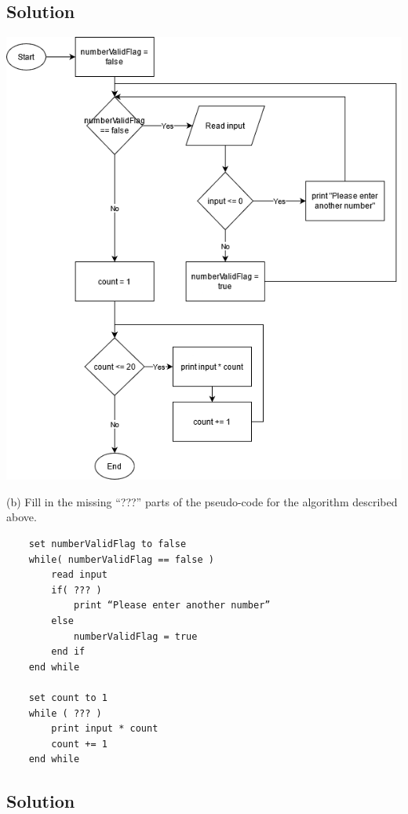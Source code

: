 \documentclass{article}
\begin{document}
    \subsection*{Solution}

    \begin{center}
        \includegraphics[scale=0.7]{Problem1_a.png}
    \end{center}

    (b) Fill in the missing “???” parts of the pseudo-code for the algorithm described
    above.

    \begin{verbatim}
    set numberValidFlag to false
    while( numberValidFlag == false )
        read input
        if( ??? )
            print “Please enter another number”
        else
            numberValidFlag = true
        end if
    end while

    set count to 1
    while ( ??? )
        print input * count
        count += 1
    end while
    \end{verbatim}

    \subsection*{Solution}
    
\end{document}
